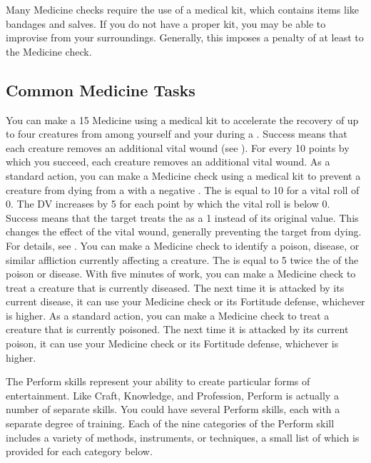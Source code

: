   Many Medicine checks require the use of a medical kit, which contains items like bandages and salves.
  If you do not have a proper kit, you may be able to improvise from your surroundings.
  Generally, this imposes a penalty of at least  to the Medicine check.

  \subsection{Common Medicine Tasks}
    You can make a  15 Medicine  using a medical kit to accelerate the recovery of up to four creatures from among yourself and your  during a .
    Success means that each creature removes an additional vital wound (see ).
    For every 10 points by which you succeed, each creature removes an additional vital wound.
    As a standard action, you can make a Medicine check using a medical kit to prevent a creature from dying from a  with a negative .
    The  is equal to 10 for a vital roll of 0.
    The DV increases by 5 for each point by which the vital roll is below 0.
    Success means that the target treats the  as a 1 instead of its original value.
    This changes the effect of the vital wound, generally preventing the target from dying.
    For details, see .
    You can make a Medicine check to identify a poison, disease, or similar affliction currently affecting a creature.
    The  is equal to 5 \add twice the  of the poison or disease.
     With five minutes of work, you can make a Medicine check to treat a creature that is currently diseased.
    The next time it is attacked by its current disease, it can use your Medicine check or its Fortitude defense, whichever is higher.
     As a standard action, you can make a Medicine check to treat a creature that is currently poisoned.
    The next time it is attacked by its current poison, it can use your Medicine check or its Fortitude defense, whichever is higher.

\newpage
{}
  The Perform skills represent your ability to create particular forms of entertainment.
  Like Craft, Knowledge, and Profession, Perform is actually a number of separate skills.
  You could have several Perform skills, each with a separate degree of training.
  Each of the nine categories of the Perform skill includes a variety of methods, instruments, or techniques, a small list of which is provided for each category below.

